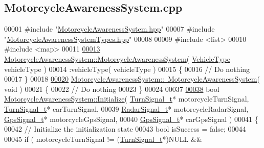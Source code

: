 \hypertarget{MotorcycleAwarenessSystem_8cpp_source}{\subsection{Motorcycle\-Awareness\-System.\-cpp}
}

\begin{DoxyCode}
00001 \textcolor{preprocessor}{#include "\hyperlink{MotorcycleAwarenessSystem_8hpp}{MotorcycleAwarenessSystem.hpp}"}
00007 \textcolor{preprocessor}{#include "\hyperlink{MotorcycleAwarenessSystemTypes_8hpp}{MotorcycleAwarenessSystemTypes.hpp}"}
00008 
00009 \textcolor{preprocessor}{#include <list>}
00010 \textcolor{preprocessor}{#include <map>}
00011 
\hypertarget{MotorcycleAwarenessSystem_8cpp_source_l00013}{}\hyperlink{classMotorcycleAwarenessSystem_ab0fb3823809dc056fecc82cc72a80a55}{00013} \hyperlink{classMotorcycleAwarenessSystem_ab0fb3823809dc056fecc82cc72a80a55}{MotorcycleAwarenessSystem::MotorcycleAwarenessSystem}( 
      \hyperlink{MotorcycleAwarenessSystemTypes_8hpp_a0c05c42b98a847f971385c81c2a81afa}{VehicleType} vehicleType )
00014     :vehicleType( vehicleType )
00015 \{
00016     \textcolor{comment}{// Do nothing}
00017 \}
00018 
\hypertarget{MotorcycleAwarenessSystem_8cpp_source_l00020}{}\hyperlink{classMotorcycleAwarenessSystem_a89ce16a722b3575e1415cbe9c7eedbd3}{00020} \hyperlink{classMotorcycleAwarenessSystem_a89ce16a722b3575e1415cbe9c7eedbd3}{MotorcycleAwarenessSystem::~MotorcycleAwarenessSystem}(
       \textcolor{keywordtype}{void} )
00021 \{
00022     \textcolor{comment}{// Do nothing}
00023 \}
00024 
00037 
\hypertarget{MotorcycleAwarenessSystem_8cpp_source_l00038}{}\hyperlink{classMotorcycleAwarenessSystem_a341f27867c8d6aa0865040279ee246a9}{00038} \textcolor{keywordtype}{bool} \hyperlink{classMotorcycleAwarenessSystem_a341f27867c8d6aa0865040279ee246a9}{MotorcycleAwarenessSystem::Initialize}( 
      \hyperlink{structTurnSignal__t}{TurnSignal\_t}* motorcycleTurnSignal, \hyperlink{structTurnSignal__t}{TurnSignal\_t}* carTurnSignal,
00039                                             \hyperlink{structRadarSignal__t}{RadarSignal\_t}* motorcycleRadarSignal, 
      \hyperlink{structGpsSignal__t}{GpsSignal\_t}* motorcycleGpsSignal,
00040                                             \hyperlink{structGpsSignal__t}{GpsSignal\_t}* carGpsSignal  )
00041 \{
00042     \textcolor{comment}{// Initialize the initialization state}
00043     \textcolor{keywordtype}{bool} isSuccess = \textcolor{keyword}{false};
00044 
00045     \textcolor{keywordflow}{if} ( motorcycleTurnSignal != (\hyperlink{structTurnSignal__t}{TurnSignal\_t}*)NULL &&

\end{DoxyCode}
